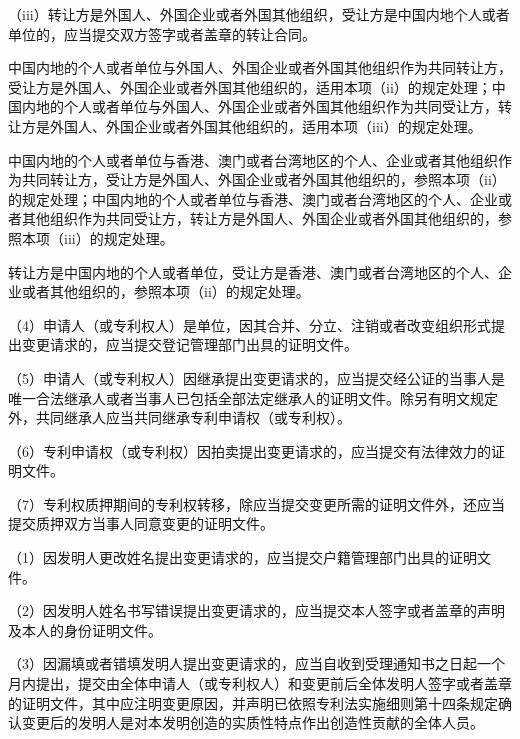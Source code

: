 {\setlength{\parindent}{17.1bp}（iii）转让方是外国人、外国企业或者外国其他组织，受让方是中国内地个人或者单位的，应当提交双方签字或者盖章的转让合同。\par}

中国内地的个人或者单位与外国人、外国企业或者外国其他组织作为共同转让方，受让方是外国人、外国企业或者外国其他组织的，适用本项（ii）的规定处理；中国内地的个人或者单位与外国人、外国企业或者外国其他组织作为共同受让方，转让方是外国人、外国企业或者外国其他组织的，适用本项（iii）的规定处理。

中国内地的个人或者单位与香港、澳门或者台湾地区的个人、企业或者其他组织作为共同转让方，受让方是外国人、外国企业或者外国其他组织的，参照本项（ii）的规定处理；中国内地的个人或者单位与香港、澳门或者台湾地区的个人、企业或者其他组织作为共同受让方，转让方是外国人、外国企业或者外国其他组织的，参照本项（iii）的规定处理。

转让方是中国内地的个人或者单位，受让方是香港、澳门或者台湾地区的个人、企业或者其他组织的，参照本项（ii）的规定处理。

{\setlength{\parindent}{17.1bp}（4）申请人（或专利权人）是单位，因其合并、分立、注销或者改变组织形式提出变更请求的，应当提交登记管理部门出具的证明文件。\par}

{\setlength{\parindent}{17.1bp}（5）申请人（或专利权人）因继承提出变更请求的，应当提交经公证的当事人是唯一合法继承人或者当事人已包括全部法定继承人的证明文件。除另有明文规定外，共同继承人应当共同继承专利申请权（或专利权）。\par}

{\setlength{\parindent}{17.1bp}（6）专利申请权（或专利权）因拍卖提出变更请求的，应当提交有法律效力的证明文件。\par}

{\setlength{\parindent}{17.1bp}（7）专利权质押期间的专利权转移，除应当提交变更所需的证明文件外，还应当提交质押双方当事人同意变更的证明文件。\par}

{\setlength{\parindent}{17.1bp}（1）因发明人更改姓名提出变更请求的，应当提交户籍管理部门出具的证明文件。\par}

{\setlength{\parindent}{17.1bp}（2）因发明人姓名书写错误提出变更请求的，应当提交本人签字或者盖章的声明及本人的身份证明文件。\par}

{\setlength{\parindent}{17.1bp}（3）因漏填或者错填发明人提出变更请求的，应当自收到受理通知书之日起一个月内提出，提交由全体申请人（或专利权人）和变更前后全体发明人签字或者盖章的证明文件，其中应注明变更原因，并声明已依照专利法实施细则第十四条规定确认变更后的发明人是对本发明创造的实质性特点作出创造性贡献的全体人员。\par}

